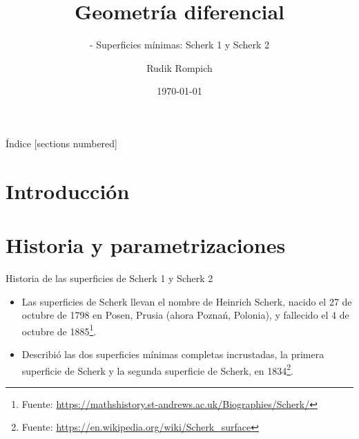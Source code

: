 \documentclass[10pt]{beamer}
\title{ Geometría diferencial}
\subtitle{ - Superficies mínimas: Scherk 1 y Scherk 2 }
\author{Rudik Rompich}
\institute{Universidad del Valle de Guatemala }
\date{\today}
\begin{document}
\maketitle

\usebackgroundtemplate{}


\begin{frame}{Índice}
[sections numbered]
\tableofcontents[hideallsubsections]
\end{frame}

\section{Introducción }


\section{Historia y parametrizaciones }

  \begin{frame}{Historia de las superficies de Scherk 1 y Scherk 2}
    
    \begin{itemize}
      \item Las superficies de Scherk llevan el nombre de Heinrich Scherk, nacido el 27 de octubre de 1798 en Posen, Prusia (ahora Poznań, Polonia), y fallecido el 4 de octubre de 1885\footnote{Fuente: \url{https://mathshistory.st-andrews.ac.uk/Biographies/Scherk/}}.
      \item Describió las dos superficies mínimas completas incrustadas, la primera superficie de Scherk y la segunda superficie de Scherk, en 1834\footnote{Fuente: \url{https://en.wikipedia.org/wiki/Scherk_surface}}.
    \end{itemize}
    \end{frame}
    
\end{document}
